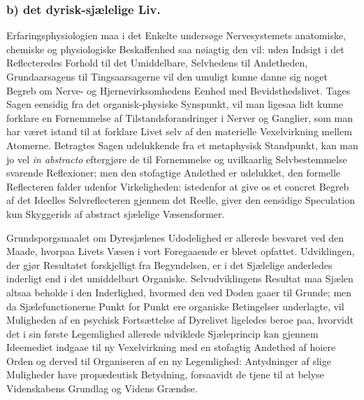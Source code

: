 \documentclass[11pt]{book}
\newcommand{\opage}[1]{\marginnote{\footnotesize\textit{[#1]}}}
\begin{document}
\subsubsection*{b) det dyrisk-sjælelige Liv.}

Erfaringsphysiologien maa i det Enkelte undersøge Nervesystemets
anatomiske, chemiske og physiologiske Beskaffenhed saa nøiagtig den
vil: uden Indsigt i det Reflecteredes Forhold til det Umiddelbare,
Selvhedens til Andetheden, Grundaarsagens til Tingsaarsagerne vil den
umuligt kunne danne sig noget Begreb om Nerve- og
Hjernevirksomhedens Eenhed med Bevidsthedslivet. Tages Sagen eensidig
fra det organisk-physiske
\opage{273} \setcounter{footnote}{0}%
Synspunkt, vil man ligesaa lidt kunne
forklare en Fornemmelse af Tilstandsforandringer i Nerver og Ganglier,
som man har været istand til at forklare Livet selv af den materielle
Vexelvirkning mellem Atomerne. Betragtes Sagen udelukkende fra et
metaphysisk Standpunkt, kan man jo vel \textit{in abstracto}
eftergjøre de til Fornemmelse og uvilkaarlig Selvbestemmelse svarende
Reflexioner; men den stofagtige Andethed er udelukket, den formelle
Reflecteren falder udenfor Virkeligheden: istedenfor at give os et
concret Begreb af det Ideelles Selvreflecteren gjennem det Reelle,
giver den eensidige Speculation kun Skyggerids af abstract sjælelige
Væsensformer.

Grundsporgsmaalet om Dyresjælenes Udodelighed er allerede besvaret
ved den Maade, hvorpaa Livets Væsen i vort Foregaaende er blevet
opfattet. Udviklingen, der gjør Resultatet forskjelligt fra
Begyndelsen, er i det Sjælelige anderledes inderligt end i det
umiddelbart Organiske. Selvudviklingens Resultat maa Sjælen altsaa
beholde i den Inderlighed, hvormed den ved Doden gaaer til Grunde; men
da Sjælefunctionerne Punkt for Punkt ere organiske Betingelser
underlagte, vil Muligheden af en psychisk Fortsættelse af Dyrelivet
ligeledes beroe paa, hvorvidt det i sin første Legemlighed allerede
udviklede Sjæleprincip kan gjennem Ideemediet indgaae til ny
Vexelvirkning med en stofagtig Andethed af hoiere Orden og derved til
Organiseren af en ny Legemlighed: Antydninger af slige Muligheder have
propædeutisk Betydning, forsaavidt de tjene til at belyse
Videnskabens Grundlag og Videns Grændse.
\end{document}
